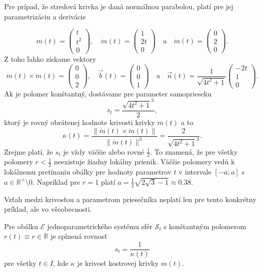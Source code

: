 \begin{example}
Pre prípad, že stredová krivka je daná normálnou parabolou, platí pre jej parametrizáciu a derivácie

\[
m(t) = \begin{pmatrix} t \\ t^2 \\ 0 \end{pmatrix}, \quad \dot{m}(t) = \begin{pmatrix} 1 \\ 2t \\ 0 \end{pmatrix} \quad \text{a} \quad \ddot{m}(t) = \begin{pmatrix} 0 \\ 2 \\ 0 \end{pmatrix}.
\]
Z toho ľahko získame vektory 
$$ \dot{m}(t) \times \ddot{m}(t) =
\begin{pmatrix} 0 \\ 0 \\ 2 \end{pmatrix} , \quad \vec{b}(t) = \begin{pmatrix} 0 \\ 0 \\ 1 \end{pmatrix} \quad  \text{a} \quad \vec{n}(t) = \dfrac{1}{\sqrt{4t^2 + 1}} \begin{pmatrix} -2t \\ 1 \\ 0 \end{pmatrix}.$$
Ak je polomer konštantný, dostávame pre parameter samoprieseku
$$ s_t = \dfrac{\sqrt{4t^2 + 1}^3}{2}, $$
ktorý je rovný obrátenej hodnote krivosti krivky $m(t)$ a to
$$ \kappa(t) = \frac{\lVert  \dot{m}(t) \times \ddot{m}(t) \rVert}{\lVert \dot{m}(t) \rVert^3} = \frac{2}{\sqrt{4t^2 + 1}^3}. $$
Zrejme platí, že $s_t$ je vždy väčšie alebo rovné $\frac{1}{2}$. To znamená, že pre všetky polomery $r < \frac{1}{2}$ neexistuje žiadny lokálny prienik. Väčšie polomery vedú k lokálnemu pretínaniu obálky pre hodnoty parametrov $t$ v intervale $[-a; a]$ s $a \in \mathbb{R}^+ \setminus {0}$. Napríklad pre $r = 1$ platí $a = \frac{1}{2} \sqrt{2 \sqrt{3} - 1} \approx 0.38$.
\end{example}

Vzťah medzi krivosťou a parametrom priesečníka neplatí len pre tento konkrétny príklad, ale vo všeobecnosti.

\begin{lemma}
Pre obálku $\mathcal{E}$ jednoparametrického systému sfér $\mathcal{S}_t$ s konštantným polomerom $r(t) \equiv r \in \mathbb{R}$ je splnená rovnosť 
$$ s_t = \dfrac{1}{\kappa(t)} $$
pre všetky $t \in I$, kde $\kappa$ je krivosť kostrovej krivky $m(t).$
\end{lemma}

